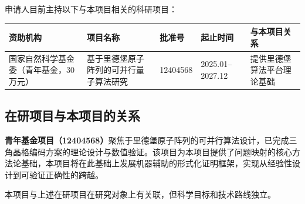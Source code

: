 
申请人目前主持以下与本项目相关的科研项目：

\begin{table}[htbp]
\centering
\small
\begin{tabular}{|p{2.5cm}|p{3cm}|p{2.3cm}|p{1.8cm}|p{3cm}|}
\hline
\textbf{资助机构} & \textbf{项目名称} & \textbf{批准号} & \textbf{起止时间} & \textbf{与本项目关系} \\
\hline
国家自然科学基金委（青年基金，30万元） & 基于里德堡原子阵列的可并行量子算法研究 & 12404568 & 2025.01--2027.12 & 提供里德堡算法平台理论基础 \\
\hline
\end{tabular}
\end{table}

\subsection*{在研项目与本项目的关系}

\textbf{青年基金项目（12404568）}聚焦于里德堡原子阵列的可并行算法设计，已完成三角晶格编码方案的理论设计与数值验证。该项目为本项目提供了问题映射的核心方法论基础，本项目将在此基础上发展机器辅助的形式化证明框架，实现从经验性设计到可验证正确性的跨越。

本项目与上述在研项目在研究对象上有关联，但科学目标和技术路线独立。
